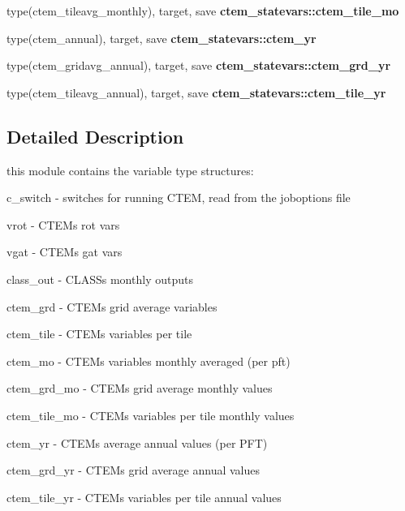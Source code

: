 \begin{DoxyCompactItemize}
\item 
\hypertarget{namespacectem__statevars_af68043090dc6cd2c0615eb7d4b550b18}{}type(ctem\+\_\+tileavg\+\_\+monthly), target, save {\bfseries ctem\+\_\+statevars\+::ctem\+\_\+tile\+\_\+mo}\label{namespacectem__statevars_af68043090dc6cd2c0615eb7d4b550b18}

\item 
\hypertarget{namespacectem__statevars_aa83b75c65f5aa4de37ef1f55a6a54193}{}type(ctem\+\_\+annual), target, save {\bfseries ctem\+\_\+statevars\+::ctem\+\_\+yr}\label{namespacectem__statevars_aa83b75c65f5aa4de37ef1f55a6a54193}

\item 
\hypertarget{namespacectem__statevars_a3fe8917df668048f8e960e0c5c8427e3}{}type(ctem\+\_\+gridavg\+\_\+annual), target, save {\bfseries ctem\+\_\+statevars\+::ctem\+\_\+grd\+\_\+yr}\label{namespacectem__statevars_a3fe8917df668048f8e960e0c5c8427e3}

\item 
\hypertarget{namespacectem__statevars_a74e5918629cea2b5e0e8cd50b271f917}{}type(ctem\+\_\+tileavg\+\_\+annual), target, save {\bfseries ctem\+\_\+statevars\+::ctem\+\_\+tile\+\_\+yr}\label{namespacectem__statevars_a74e5918629cea2b5e0e8cd50b271f917}

\end{DoxyCompactItemize}


\subsection{Detailed Description}
this module contains the variable type structures\+: 


\begin{DoxyEnumerate}
\item c\+\_\+switch -\/ switches for running C\+T\+E\+M, read from the joboptions file
\item vrot -\/ C\+T\+E\+M\textquotesingle{}s \textquotesingle{}rot\textquotesingle{} vars
\item vgat -\/ C\+T\+E\+M\textquotesingle{}s \textquotesingle{}gat\textquotesingle{} vars
\item class\+\_\+out -\/ C\+L\+A\+S\+S\textquotesingle{}s monthly outputs
\item ctem\+\_\+grd -\/ C\+T\+E\+M\textquotesingle{}s grid average variables
\item ctem\+\_\+tile -\/ C\+T\+E\+M\textquotesingle{}s variables per tile
\item ctem\+\_\+mo -\/ C\+T\+E\+M\textquotesingle{}s variables monthly averaged (per pft)
\item ctem\+\_\+grd\+\_\+mo -\/ C\+T\+E\+M\textquotesingle{}s grid average monthly values
\item ctem\+\_\+tile\+\_\+mo -\/ C\+T\+E\+M\textquotesingle{}s variables per tile monthly values
\item ctem\+\_\+yr -\/ C\+T\+E\+M\textquotesingle{}s average annual values (per P\+F\+T)
\item ctem\+\_\+grd\+\_\+yr -\/ C\+T\+E\+M\textquotesingle{}s grid average annual values
\item ctem\+\_\+tile\+\_\+yr -\/ C\+T\+E\+M\textquotesingle{}s variables per tile annual values 
\end{DoxyEnumerate}